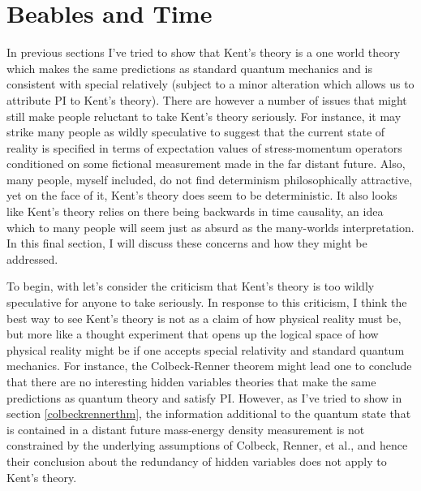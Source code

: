 \section{Beables and Time\label{beablesandtime}}
In previous sections I've tried to show that Kent's theory is a one world theory which makes the same predictions as standard quantum mechanics and is consistent with special relatively (subject to a minor alteration which allows us to attribute PI to Kent's theory). There are however a number of issues that might still make people reluctant to take Kent's theory seriously. For instance, it may strike many people as wildly speculative to suggest that the current state of reality is specified in terms of expectation values of stress-momentum operators conditioned on some fictional measurement made in the far distant future. Also, many people, myself included, do not find determinism philosophically attractive, yet on the face of it, Kent's theory does seem to be deterministic. It also looks like Kent's theory relies on there being backwards in time causality, an idea which to many people will seem just as absurd as the many-worlds interpretation. In this final section, I will discuss these concerns and how they might be addressed.

To begin, with let's consider the criticism that Kent's theory is too wildly speculative for anyone to take seriously. In response to this criticism, I think the best way to see Kent's theory is not as a claim of how physical reality must be, but more like a thought experiment that opens up the logical space of how physical reality might be if one accepts special relativity and standard quantum mechanics. For instance, the Colbeck-Renner theorem might lead one to conclude that there are no interesting hidden variables theories that make the same predictions as quantum theory and satisfy PI. However, as I've tried to show in section \ref{colbeckrennerthm}, the information additional to the quantum state that is contained in a distant future mass-energy density measurement is not constrained by the underlying assumptions of Colbeck, Renner, et al., and hence their conclusion about the redundancy of hidden variables does not apply to Kent's theory. 

